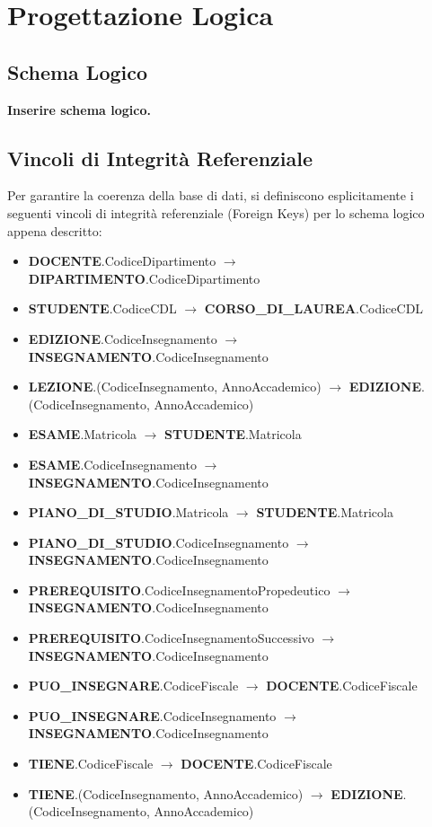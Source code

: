 \section{Progettazione Logica}

\subsection{Schema Logico}

\textbf{Inserire schema logico.}

\subsection{Vincoli di Integrità Referenziale}
Per garantire la coerenza della base di dati, si definiscono esplicitamente i seguenti vincoli di integrità referenziale (Foreign Keys) per lo schema logico appena descritto:

\begin{itemize}
    \item \textbf{DOCENTE}.CodiceDipartimento $\rightarrow$ \textbf{DIPARTIMENTO}.CodiceDipartimento
    \item \textbf{STUDENTE}.CodiceCDL $\rightarrow$ \textbf{CORSO\_DI\_LAUREA}.CodiceCDL
    \item \textbf{EDIZIONE}.CodiceInsegnamento $\rightarrow$ \textbf{INSEGNAMENTO}.CodiceInsegnamento
    \item \textbf{LEZIONE}.(CodiceInsegnamento, AnnoAccademico) $\rightarrow$ \textbf{EDIZIONE}.(CodiceInsegnamento, AnnoAccademico)
    \item \textbf{ESAME}.Matricola $\rightarrow$ \textbf{STUDENTE}.Matricola
    \item \textbf{ESAME}.CodiceInsegnamento $\rightarrow$ \textbf{INSEGNAMENTO}.CodiceInsegnamento
    \item \textbf{PIANO\_DI\_STUDIO}.Matricola $\rightarrow$ \textbf{STUDENTE}.Matricola
    \item \textbf{PIANO\_DI\_STUDIO}.CodiceInsegnamento $\rightarrow$ \textbf{INSEGNAMENTO}.CodiceInsegnamento
    \item \textbf{PREREQUISITO}.CodiceInsegnamentoPropedeutico $\rightarrow$ \textbf{INSEGNAMENTO}.CodiceInsegnamento
    \item \textbf{PREREQUISITO}.CodiceInsegnamentoSuccessivo $\rightarrow$ \textbf{INSEGNAMENTO}.CodiceInsegnamento
    \item \textbf{PUO\_INSEGNARE}.CodiceFiscale $\rightarrow$ \textbf{DOCENTE}.CodiceFiscale
    \item \textbf{PUO\_INSEGNARE}.CodiceInsegnamento $\rightarrow$ \textbf{INSEGNAMENTO}.CodiceInsegnamento
    \item \textbf{TIENE}.CodiceFiscale $\rightarrow$ \textbf{DOCENTE}.CodiceFiscale
    \item \textbf{TIENE}.(CodiceInsegnamento, AnnoAccademico) $\rightarrow$ \textbf{EDIZIONE}.(CodiceInsegnamento, AnnoAccademico)
\end{itemize}

